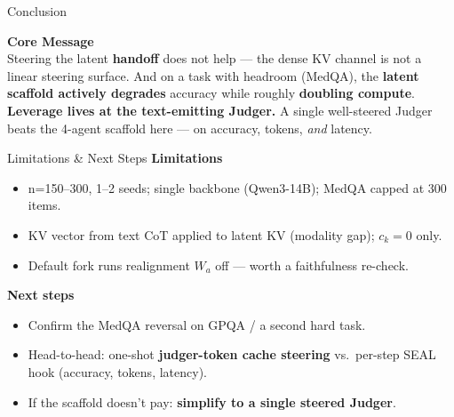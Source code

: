 \documentclass{beamer}
\begin{document}
\begin{frame}{Conclusion}
    \begin{center}
        \Large \textbf{Core Message} \\
        \vspace{0.5cm}
        \normalsize
        Steering the latent \textbf{handoff} does not help --- the dense KV channel is not a linear steering surface. And on a task with headroom (MedQA), the \textbf{latent scaffold actively degrades} accuracy while roughly \textbf{doubling compute}.
        \\[0.4cm]
        \textbf{Leverage lives at the text-emitting Judger.} A single well-steered Judger beats the 4-agent scaffold here --- on accuracy, tokens, \emph{and} latency.
    \end{center}
\end{frame}

\begin{frame}{Limitations \& Next Steps}
    \textbf{Limitations}
    \begin{itemize}
        \item n=150--300, 1--2 seeds; single backbone (Qwen3-14B); MedQA capped at 300 items.
        \item KV vector from text CoT applied to latent KV (modality gap); $c_k=0$ only.
        \item Default fork runs realignment $W_a$ off --- worth a faithfulness re-check.
    \end{itemize}
    \vspace{0.2cm}
    \textbf{Next steps}
    \begin{itemize}
        \item Confirm the MedQA reversal on GPQA / a second hard task.
        \item Head-to-head: one-shot \textbf{judger-token cache steering} vs.\ per-step SEAL hook (accuracy, tokens, latency).
        \item If the scaffold doesn't pay: \textbf{simplify to a single steered Judger}.
    \end{itemize}
\end{frame}
\end{document}
